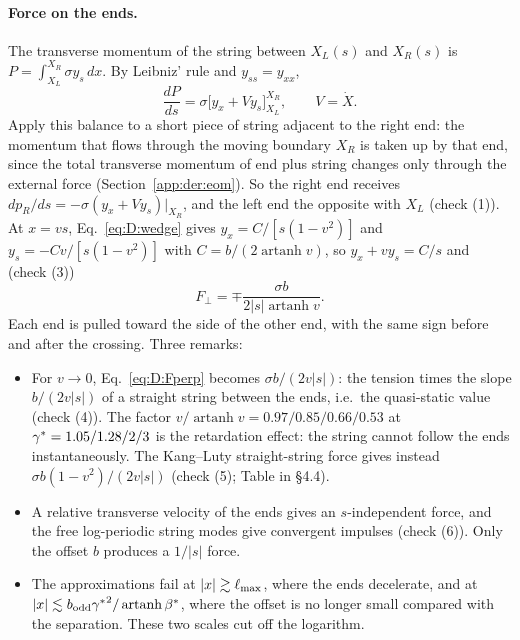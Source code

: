 \paragraph{Force on the ends.} The transverse momentum of the string between $X_L(s)$ and $X_R(s)$ is
$P=\int_{X_L}^{X_R}\sigma y_s\,dx$. By Leibniz' rule and $y_{ss}=y_{xx}$,
\begin{equation}
  \frac{dP}{ds}=\sigma\bigl[y_x+V y_s\bigr]_{X_L}^{X_R},\qquad V=\dot X .
\end{equation}
Apply this balance to a short piece of string adjacent to the right end: the momentum that flows through the moving
boundary $X_R$ is taken up by that end, since the total transverse momentum of end plus string changes only through the
external force (Section~\ref{app:der:eom}). So the right end receives
$dp_R/ds=-\sigma(y_x+Vy_s)|_{X_R}$, and the left end the opposite with $X_L$ (check  (1)). At $x=vs$,
Eq.~\eqref{eq:D:wedge} gives $y_x=C/[s(1-v^2)]$ and $y_s=-Cv/[s(1-v^2)]$ with $C=b/(2\operatorname{artanh}v)$, so
$y_x+vy_s=C/s$ and (check  (3))
\begin{equation}
  F_\perp=\mp\frac{\sigma b}{2|s|\operatorname{artanh}v}.
  \label{eq:D:Fperp}
\end{equation}
Each end is pulled toward the side of the other end, with the same sign before and after the crossing. Three remarks:
\begin{itemize}
\item For $v\to0$, Eq.~\eqref{eq:D:Fperp} becomes $\sigma b/(2v|s|)$: the tension times the slope $b/(2v|s|)$ of a
  straight string between the ends, i.e.\ the quasi-static value (check  (4)). The factor
  $v/\operatorname{artanh}v=0.97/0.85/0.66/0.53$ at $\gamma^*=1.05/1.28/2/3$ is the retardation effect: the string cannot
  follow the ends instantaneously. The Kang--Luty straight-string force gives instead $\sigma b(1-v^2)/(2v|s|)$ (check
   (5); Table in  \S4.4).
\item A relative transverse velocity of the ends gives an $s$-independent force, and the free log-periodic string modes
  give convergent impulses (check  (6)). Only the offset $b$ produces a $1/|s|$ force.
\item The approximations fail at $|x|\gtrsim\ell_{\max}$, where the ends decelerate, and at $|x|\lesssim b_{\rm odd}{\gamma^*}^2/\operatorname{artanh}\beta^*$,
  where the offset is no longer small compared with the separation. These two scales cut off the logarithm.
\end{itemize}

